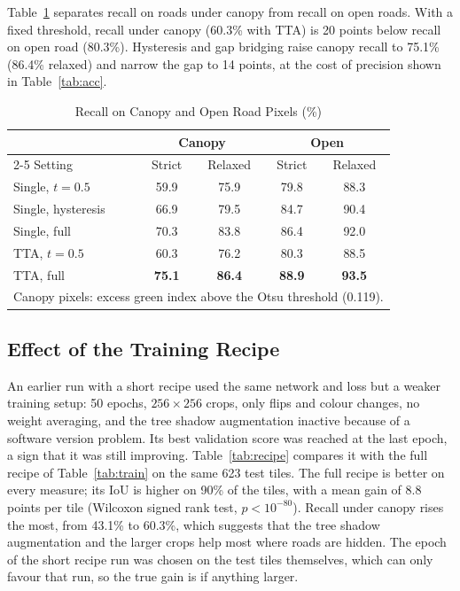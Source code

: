 \documentclass{ieeeaccess}
\begin{document}
Table~\ref{tab:canopy} separates recall on roads under canopy from recall on open roads. With a fixed threshold, recall under canopy (60.3\% with TTA) is 20 points below recall on open road (80.3\%). Hysteresis and gap bridging raise canopy recall to 75.1\% (86.4\% relaxed) and narrow the gap to 14 points, at the cost of precision shown in Table~\ref{tab:acc}.

\begin{table}[t]
\caption{Recall on Canopy and Open Road Pixels (\%)}
\label{tab:canopy}
\setlength{\tabcolsep}{4pt}
\tablebodyfont
\begin{tabular}{|l|c|c|c|c|}
\hline
 & \multicolumn{2}{c|}{Canopy} & \multicolumn{2}{c|}{Open} \\
\cline{2-5}
Setting & Strict & Relaxed & Strict & Relaxed \\
\hline
Single, $t = 0.5$ & 59.9 & 75.9 & 79.8 & 88.3 \\
Single, hysteresis & 66.9 & 79.5 & 84.7 & 90.4 \\
Single, full & 70.3 & 83.8 & 86.4 & 92.0 \\
TTA, $t = 0.5$ & 60.3 & 76.2 & 80.3 & 88.5 \\
TTA, full & \textbf{75.1} & \textbf{86.4} & \textbf{88.9} & \textbf{93.5} \\
\hline
\multicolumn{5}{p{200pt}}{Canopy pixels: excess green index above the Otsu threshold (0.119).}
\end{tabular}
\end{table}

\subsection{Effect of the Training Recipe}

An earlier run with a short recipe used the same network and loss but a weaker training setup: 50 epochs, $256 \times 256$ crops, only flips and colour changes, no weight averaging, and the tree shadow augmentation inactive because of a software version problem. Its best validation score was reached at the last epoch, a sign that it was still improving. Table~\ref{tab:recipe} compares it with the full recipe of Table~\ref{tab:train} on the same 623 test tiles. The full recipe is better on every measure; its IoU is higher on 90\% of the tiles, with a mean gain of 8.8 points per tile (Wilcoxon signed rank test, $p < 10^{-80}$). Recall under canopy rises the most, from 43.1\% to 60.3\%, which suggests that the tree shadow augmentation and the larger crops help most where roads are hidden. The epoch of the short recipe run was chosen on the test tiles themselves, which can only favour that run, so the true gain is if anything larger.
\end{document}
